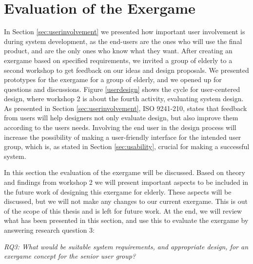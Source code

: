 \section{Evaluation of the Exergame}
\label{sec:discfindings2}
In Section \ref{sec:userinvolvement} we presented how important user involvement is during system development, as the end-users are the ones who will use the final product, and are the only ones who know what they want. After creating an exergame based on specified requirements, we invited a group of elderly to a second workshop to get feedback on our ideas and design proposals. We presented prototypes for the exergame for a group of elderly, and we opened up for questions and discussions. Figure \ref{userdesign} shows the cycle for user-centered design, where workshop 2 is about the fourth activity, evaluating system design. As presented in Section \ref{sec:userinvolvement}, ISO 9241-210, states that feedback from users will help designers not only evaluate design, but also improve them according to the users needs. Involving the end user in the design process will increase the possibility of making a user-friendly interface for the intended user group, which is, as stated in Section \ref{sec:usability}, crucial for making a successful system. 

In this section the evaluation of the exergame will be discussed. Based on theory and findings from workshop 2 we will present important aspects to be included in the future work of designing this exergame for elderly. These aspects will be discussed, but we will not make any changes to our current exergame. This is out of the scope of this thesis and is left for future work. At the end, we will review what has been presented in this section, and use this to evaluate the exergame by answering research question 3:

\emph{RQ3: What would be suitable system requirements, and appropriate design, for an exergame concept for the senior user group?}

